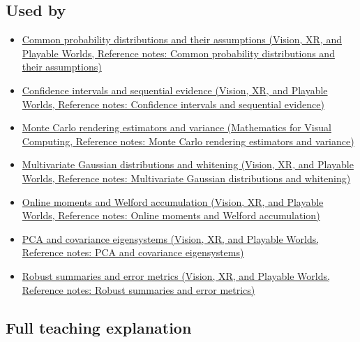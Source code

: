 \subsection{Used by}\label{appendix-54c383df9992-used-by}

\begin{itemize}
\tightlist
\item
  \href{../07-Vision-XR-and-Playable-Worlds/main.pdf\#nameddest=appendix-a2360b435383}{Common probability distributions and their assumptions (Vision, XR, and Playable Worlds, Reference notes: Common probability distributions and their assumptions)}
\item
  \href{../07-Vision-XR-and-Playable-Worlds/main.pdf\#nameddest=appendix-c83016554b1e}{Confidence intervals and sequential evidence (Vision, XR, and Playable Worlds, Reference notes: Confidence intervals and sequential evidence)}
\item
  \href{../02-Mathematics-for-Visual-Computing/main.pdf\#nameddest=appendix-031e02bf28af}{Monte Carlo rendering estimators and variance (Mathematics for Visual Computing, Reference notes: Monte Carlo rendering estimators and variance)}
\item
  \href{../07-Vision-XR-and-Playable-Worlds/main.pdf\#nameddest=appendix-12bbe185dbe5}{Multivariate Gaussian distributions and whitening (Vision, XR, and Playable Worlds, Reference notes: Multivariate Gaussian distributions and whitening)}
\item
  \href{../07-Vision-XR-and-Playable-Worlds/main.pdf\#nameddest=appendix-33237f0f618b}{Online moments and Welford accumulation (Vision, XR, and Playable Worlds, Reference notes: Online moments and Welford accumulation)}
\item
  \href{../07-Vision-XR-and-Playable-Worlds/main.pdf\#nameddest=appendix-ad175ef3c5bf}{PCA and covariance eigensystems (Vision, XR, and Playable Worlds, Reference notes: PCA and covariance eigensystems)}
\item
  \href{../07-Vision-XR-and-Playable-Worlds/main.pdf\#nameddest=appendix-bcc44e9d3d02}{Robust summaries and error metrics (Vision, XR, and Playable Worlds, Reference notes: Robust summaries and error metrics)}
\end{itemize}

\subsection{Full teaching explanation}\label{appendix-54c383df9992-full-teaching-explanation}

